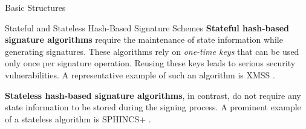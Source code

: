 \begin{section}{Basic Structures}{\label{sec1}}
\begin{subsection}{Stateful and Stateless Hash-Based Signature Schemes}
\textbf{Stateful hash-based signature algorithms} require the maintenance of state information while generating signatures. These algorithms rely on \textit{one-time keys} that can be used only once per signature operation. Reusing these keys leads to serious security vulnerabilities. A representative example of such an algorithm is XMSS \cite{huelsing2018rfc}.

\textbf{Stateless hash-based signature algorithms}, in contrast, do not require any state information to be stored during the signing process. A prominent example of a stateless algorithm is SPHINCS+ \cite{bernstein2019sphincs+}.
    
\end{subsection}

\end{section}